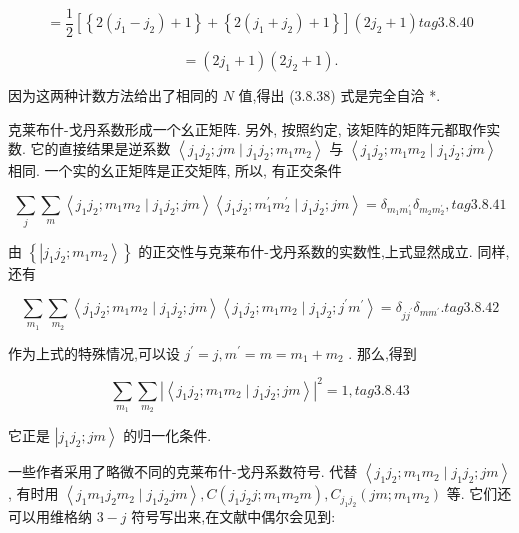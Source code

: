 $$
= \frac{1}{2}\left\lbrack {\left\{ {2\left( {{j}_{1} - {j}_{2}}\right) + 1}\right\} + \left\{ {2\left( {{j}_{1} + {j}_{2}}\right) + 1}\right\} }\right\rbrack \left( {2{j}_{2} + 1}\right) tag{3.8.40}
$$

$$
= \left( {2{j}_{1} + 1}\right) \left( {2{j}_{2} + 1}\right) \text{.}
$$

因为这两种计数方法给出了相同的 $N$ 值,得出 (3.8.38) 式是完全自洽 *.

克莱布什-戈丹系数形成一个幺正矩阵. 另外, 按照约定, 该矩阵的矩阵元都取作实数. 它的直接结果是逆系数 $\left\langle {{j}_{1}{j}_{2};{jm} \mid {j}_{1}{j}_{2};{m}_{1}{m}_{2}}\right\rangle$ 与 $\left\langle {{j}_{1}{j}_{2};{m}_{1}{m}_{2} \mid {j}_{1}{j}_{2};{jm}}\right\rangle$ 相同. 一个实的幺正矩阵是正交矩阵, 所以, 有正交条件

$$
\mathop{\sum }\limits_{j}\mathop{\sum }\limits_{m}\left\langle {{j}_{1}{j}_{2};{m}_{1}{m}_{2} \mid {j}_{1}{j}_{2};{jm}}\right\rangle \left\langle {{j}_{1}{j}_{2};{m}_{1}^{\prime }{m}_{2}^{\prime } \mid {j}_{1}{j}_{2};{jm}}\right\rangle = {\delta }_{{m}_{1}{m}_{1}^{\prime }}{\delta }_{{m}_{2}{m}_{2}^{\prime }}, tag{3.8.41}
$$

由 $\left\{ \left| {{j}_{1}{j}_{2};{m}_{1}{m}_{2}}\right\rangle \right\}$ 的正交性与克莱布什-戈丹系数的实数性,上式显然成立. 同样, 还有

$$
\mathop{\sum }\limits_{{m}_{1}}\mathop{\sum }\limits_{{m}_{2}}\left\langle {{j}_{1}{j}_{2};{m}_{1}{m}_{2} \mid {j}_{1}{j}_{2};{jm}}\right\rangle \left\langle {{j}_{1}{j}_{2};{m}_{1}{m}_{2} \mid {j}_{1}{j}_{2};{j}^{\prime }{m}^{\prime }}\right\rangle = {\delta }_{j{j}^{\prime }}{\delta }_{m{m}^{\prime }}. tag{3.8.42}
$$

作为上式的特殊情况,可以设 ${j}^{\prime } = j,{m}^{\prime } = m = {m}_{1} + {m}_{2}$ . 那么,得到

$$
\mathop{\sum }\limits_{{m}_{1}}\mathop{\sum }\limits_{{m}_{2}}{\left| \left\langle {j}_{1}{j}_{2};{m}_{1}{m}_{2} \mid {j}_{1}{j}_{2};jm\right\rangle \right| }^{2} = 1, tag{3.8.43}
$$

它正是 $\left| {{j}_{1}{j}_{2};{jm}}\right\rangle$ 的归一化条件.

一些作者采用了略微不同的克莱布什-戈丹系数符号. 代替 $\left\langle {{j}_{1}{j}_{2};{m}_{1}{m}_{2} \mid {j}_{1}{j}_{2};{jm}}\right\rangle$ , 有时用 $\left\langle {{j}_{1}{m}_{1}{j}_{2}{m}_{2} \mid {j}_{1}{j}_{2}{jm}}\right\rangle, C\left( {{j}_{1}{j}_{2}j;{m}_{1}{m}_{2}m}\right) ,{C}_{{j}_{1}{j}_{2}}\left( {{jm};{m}_{1}{m}_{2}}\right)$ 等. 它们还可以用维格纳 $3 - j$ 符号写出来,在文献中偶尔会见到:

